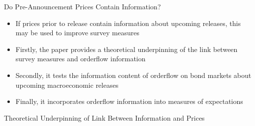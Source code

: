 \documentclass[final]{beamer}
\begin{document}
\begin{frame}
\begin{columns}[t]
\begin{column}{.43 \linewidth}
\begin{block}{Do Pre-Announcement Prices Contain Information?}
\begin{itemize}
\item If prices prior to release contain information about upcoming releases, this may be used to improve survey measures

\item Firstly, the paper provides a theoretical underpinning of the link between survey measures and
orderflow information

\item Secondly, it tests the information content of orderflow on bond markets about upcoming
macroeconomic releases

\item Finally, it incorporates orderflow information into measures of expectations

\end{itemize}
\end{block}%

\vspace{.4 cm}%

%
%
%
%
%
%
%
%
%
%
%
%
\begin{block}{Theoretical Underpinning of Link Between Information and Prices}


\end{block}
\end{column}
\end{columns}
\end{frame}
\end{document}
